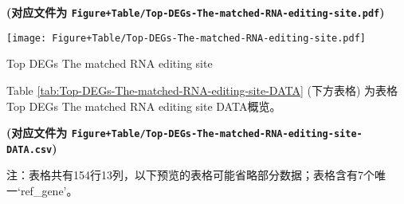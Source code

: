 \documentclass[
]{article}
\begin{document}
\textbf{(对应文件为 \texttt{Figure+Table/Top-DEGs-The-matched-RNA-editing-site.pdf})}

\def\@captype{figure}
\begin{center}
\texttt{[image: Figure+Table/Top-DEGs-The-matched-RNA-editing-site.pdf]}
\caption{Top DEGs The matched RNA editing site}\label{fig:Top-DEGs-The-matched-RNA-editing-site}
\end{center}

Table \ref{tab:Top-DEGs-The-matched-RNA-editing-site-DATA} (下方表格) 为表格Top DEGs The matched RNA editing site DATA概览。

\textbf{(对应文件为 \texttt{Figure+Table/Top-DEGs-The-matched-RNA-editing-site-DATA.csv})}

\begin{center}\begin{tcolorbox}[colback=gray!10, colframe=gray!50, width=0.9\linewidth, arc=1mm, boxrule=0.5pt]注：表格共有154行13列，以下预览的表格可能省略部分数据；表格含有7个唯一`ref\_gene'。
\end{tcolorbox}
\end{center}
\end{document}
